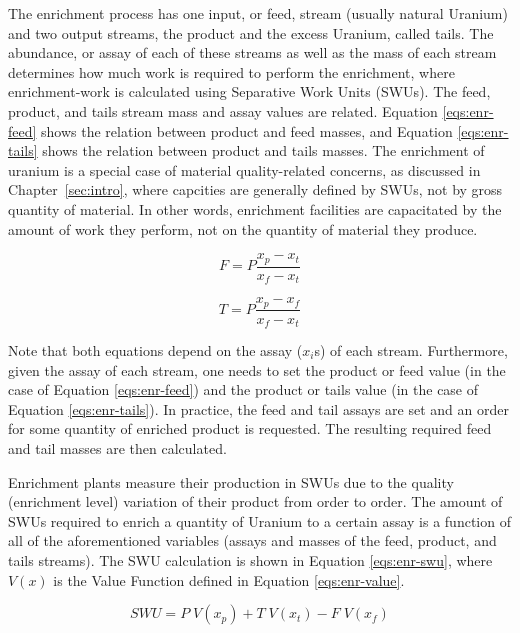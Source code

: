 The enrichment process has one input, or feed, stream (usually natural Uranium)
and two output streams, the product and the excess Uranium, called tails. The
 abundance, or assay of each of these streams as well as the mass
of each stream determines how much work is required to perform the enrichment,
where enrichment-work is calculated using Separative Work Units (SWUs). The
feed, product, and tails stream mass and assay values are related. Equation
\ref{eqs:enr-feed} shows the relation between product and feed masses, and
Equation \ref{eqs:enr-tails} shows the relation between product and tails
masses. The enrichment of uranium is a special case of material quality-related
concerns, as discussed in Chapter~\ref{sec:intro}, where capcities are generally
defined by SWUs, not by gross quantity of material. In other words, enrichment
facilities are capacitated by the amount of work they perform, not on the
quantity of material they produce.

\begin{equation}\label{eqs:enr-feed}
  F = P \frac{x_{p} - x_{t}}{x_{f} - x_{t}}
\end{equation}

\begin{equation}\label{eqs:enr-tails}
  T = P \frac{x_{p} - x_{f}}{x_{f} - x_{t}}
\end{equation}

Note that both equations depend on the  assay ($x_i$s) of each
stream. Furthermore, given the assay of each stream, one needs to set the
product or feed value (in the case of Equation \ref{eqs:enr-feed}) and the
product or tails value (in the case of Equation \ref{eqs:enr-tails}). In
practice, the feed and tail assays are set and an order for some quantity of
enriched product is requested. The resulting required feed and tail masses are
then calculated.

Enrichment plants measure their production in SWUs due to the quality
(enrichment level) variation of their product from order to order. The amount of
SWUs required to enrich a quantity of Uranium to a certain assay is a
function of all of the aforementioned variables (assays and masses of the
feed, product, and tails streams). The SWU calculation is shown in Equation
\ref{eqs:enr-swu}, where $V(x)$ is the Value Function defined in Equation
\ref{eqs:enr-value}.

\begin{equation}\label{eqs:enr-swu}
  SWU = P \; V(x_{p}) + T \; V(x_{t}) - F \; V(x_{f})
\end{equation}

